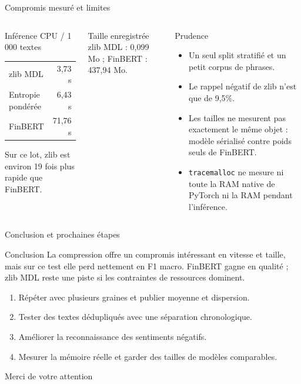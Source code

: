 \documentclass[aspectratio=169,10pt]{beamer}
\begin{document}
\begin{frame}{Compromis mesuré et limites}
  \begin{columns}[T,onlytextwidth]
      \begin{block}{Inférence CPU / 1\,000 textes}
        \begin{tabular}{lr}
          \toprule
          zlib MDL & 3,73 s\\
          Entropie pondérée & 6,43 s\\
          FinBERT & 71,76 s\\
          \bottomrule
        \end{tabular}
        \vspace{0.15cm}

        Sur ce lot, zlib est environ 19 fois plus rapide que FinBERT.
      \end{block}
      \begin{block}{Taille enregistrée}
        zlib MDL : 0,099 Mo ; FinBERT : 437,94 Mo.
      \end{block}
      \begin{alertblock}{Prudence}
        \begin{itemize}
          \item Un seul split stratifié et un petit corpus de phrases.
          \item Le rappel négatif de zlib n'est que de 9,5\%.
          \item Les tailles ne mesurent pas exactement le même objet :
          modèle sérialisé contre poids seuls de FinBERT.
          \item \texttt{tracemalloc} ne mesure ni toute la RAM native de
          PyTorch ni la RAM pendant l'inférence.
        \end{itemize}
      \end{alertblock}
  \end{columns}
\end{frame}

\begin{frame}{Conclusion et prochaines étapes}
  \begin{block}{Conclusion}
    La compression offre un compromis intéressant en vitesse et taille, mais
    sur ce test elle perd nettement en F1 macro. FinBERT gagne en qualité ;
    zlib MDL reste une piste si les contraintes de ressources dominent.
  \end{block}
  \begin{enumerate}
    \item Répéter avec plusieurs graines et publier moyenne et dispersion.
    \item Tester des textes dédupliqués avec une séparation chronologique.
    \item Améliorer la reconnaissance des sentiments négatifs.
    \item Mesurer la mémoire réelle et garder des tailles de modèles comparables.
  \end{enumerate}
  \vfill
  \begin{center}
    \Large\color{teal}Merci de votre attention
  \end{center}
\end{frame}
\end{document}
